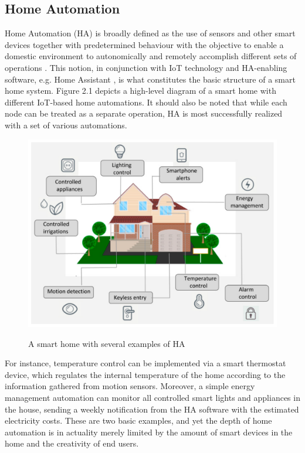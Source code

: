 \subsection{Home Automation}
Home Automation (HA) is broadly defined as the use of sensors and other smart devices together with predetermined behaviour with the objective to enable a domestic environment to autonomically and remotely accomplish different sets of operations \cite{smart_home_automation_iot_edge}. This notion, in conjunction with IoT technology and HA-enabling software, e.g. Home Assistant \cite{home_assistant}, is what constitutes the basic structure of a smart home system. Figure 2.1 depicts a high-level diagram of a smart home with different IoT-based home automations. It should also be noted that while each node can be treated as a separate operation, HA is most successfully realized with a set of various automations. 

\begin{figure}[H]
	\centering
	\includegraphics[width=0.7 \linewidth]{Images/sensors-21-03784-g001.png}
	\caption{A smart home with several examples of HA}
	\label{fig:Home_Auto_Applications}
    \cite{stolojescu-crisan_iot-based_2021}
\end{figure}

For instance, temperature control can be implemented via a smart thermostat device, which regulates the internal temperature of the home according to the information gathered from motion sensors. Moreover, a simple energy management automation can monitor all controlled smart lights and appliances in the house, sending a weekly notification from the HA software with the estimated electricity costs. These are two basic examples, and yet the depth of home automation is in actuality merely limited by the amount of smart devices in the home and the creativity of end users. 

